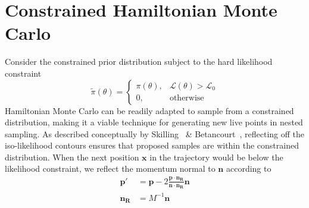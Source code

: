 \documentclass[11pt]{article}
\begin{document}
    \section{Constrained Hamiltonian Monte Carlo}\label{CHMC}
    Consider the constrained prior distribution subject to the hard likelihood constraint
    \begin{equation}\label{eq:constrained_prior}
        \tilde{\pi}(\theta) = \begin{cases}
                                  \pi(\theta), & \mathcal{L}(\theta) > \mathcal{L}_0 \\
                                  0, & \text{otherwise}
                              \end{cases}
    \end{equation}
    Hamiltonian Monte Carlo can be readily adapted to sample from a constrained distribution, making it a viable
    technique for generating new live points in nested sampling.
    As described conceptually by Skilling~\cite{GMC} \& Betancourt~\cite{Betancourt_NS_CHMC}, reflecting
    off the iso-likelihood contours ensures that proposed samples are within the constrained distribution.
    When the next position $\mathbf{x}$ in the trajectory would be below the likelihood constraint, we reflect the
    momentum normal to $\mathbf{n}$ according to
    \begin{equation}\label{eq:reflection}
    \begin{aligned}
        \mathbf{p'} &= \mathbf{p} - 2 \frac{ \mathbf{p} \cdot \mathbf{n_R} }{\mathbf{n} \cdot \mathbf{n_R}} \mathbf{n} \\
        \mathbf{n_R} &= M^{-1} \mathbf{n}
    \end{aligned}
    \end{equation}
\end{document}
